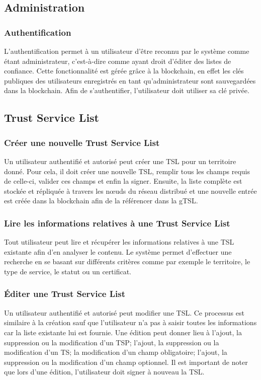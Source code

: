 \documentclass{tnreport}
\begin{document}
\subsection{Administration}
\subsubsection{Authentification}
L'authentification permet à un utilisateur d'être reconnu par le système comme étant administrateur, c'est-à-dire comme ayant droit d'éditer des listes de confiance. Cette fonctionnalité est gérée grâce à la blockchain, en effet les clés publiques des utilisateurs enregistrés en tant qu'administrateur sont sauvegardées dans la blockchain. Afin de s'authentifier, l'utilisateur doit utiliser sa clé privée.

\subsection{Trust Service List}
\label{sec:tsl}
\subsubsection{Créer une nouvelle Trust Service List}
Un utilisateur authentifié et autorisé peut créer une TSL pour un territoire donné. Pour cela, il doit créer une nouvelle TSL, remplir tous les champs requis de celle-ci, valider ces champs et enfin la signer. Ensuite, la liste complète est stockée et répliquée à travers les nœuds du réseau distribué et une nouvelle entrée est créée dans la blockchain afin de la référencer dans la gTSL.
\subsubsection{Lire les informations relatives à une Trust Service List}
Tout utilisateur peut lire et récupérer les informations relatives à une TSL existante afin d'en analyser le contenu. Le système permet d'effectuer une recherche en se basant sur différents critères comme par exemple le territoire, le type de service, le statut ou un certificat.
\subsubsection{Éditer une Trust Service List}
Un utilisateur authentifié et autorisé peut modifier une TSL. Ce processus est similaire à la création sauf que l'utilisateur n'a pas à saisir toutes les informations car la liste existante lui est fournie. Une édition peut donner lieu à l'ajout, la suppression ou la modification d'un TSP; l'ajout, la suppression ou la modification d'un TS; la modification d'un champ obligatoire; l'ajout, la suppression ou la modification d'un champ optionnel. Il est important de noter que lors d'une édition, l'utilisateur doit signer à nouveau la TSL.
\end{document}

